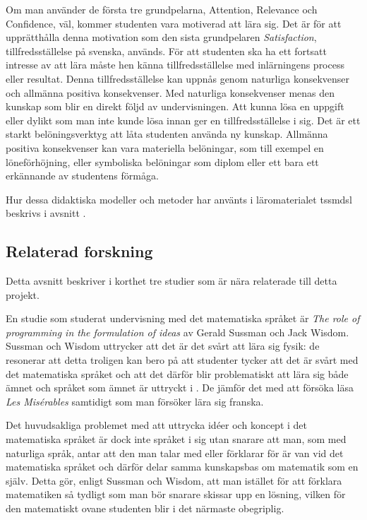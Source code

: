 \documentclass[12pt,a4paper,twoside,openright]{article}
\begin{document}
Om man använder de första tre grundpelarna, Attention, Relevance och
Confidence, väl, kommer studenten vara motiverad att lära sig. Det är
för att upprätthålla denna motivation som den sista grundpelaren
\textit{Satisfaction}, tillfredsställelse på svenska, används. För att
studenten ska ha ett fortsatt intresse av att lära måste hen känna
tillfredsställelse med inlärningens process eller resultat. Denna
tillfredsställelse kan uppnås genom naturliga konsekvenser och
allmänna positiva konsekvenser. Med naturliga konsekvenser menas den
kunskap som blir en direkt följd av undervisningen. Att kunna lösa en
uppgift eller dylikt som man inte kunde lösa innan ger en
tillfredsställelse i sig. Det är ett starkt belöningsverktyg att låta
studenten använda ny kunskap. Allmänna positiva konsekvenser kan vara
materiella belöningar, som till exempel en löneförhöjning, eller
symboliska belöningar som diplom eller ett bara ett erkännande av
studentens förmåga.

Hur dessa didaktiska modeller och metoder har använts i läromaterialet
\gls{tssmdsl} beskrivs i avsnitt .

\subsection{Relaterad forskning}
\label{sec:relForsk}
Detta avsnitt beskriver i korthet tre studier som är nära relaterade
till detta projekt.

En studie som studerat undervisning med det matematiska språket är
\textit{The role of programming in the formulation of ideas} av Gerald
Sussman och Jack Wisdom. Sussman och Wisdom uttrycker att det är det
svårt att lära sig fysik: de resonerar att detta troligen kan bero på
att studenter tycker att det är svårt med det matematiska språket och
att det därför blir problematiskt att lära sig både ämnet och språket
som ämnet är uttryckt i \cite{sussman2002role}. De jämför det med att
försöka läsa \textit{Les Misérables} samtidigt som man försöker lära
sig franska.

Det huvudsakliga problemet med att uttrycka idéer och koncept i det
matematiska språket är dock inte språket i sig utan snarare att man,
som med naturliga språk, antar att den man talar med eller förklarar
för är van vid det matematiska språket och därför delar samma
kunskapsbas om matematik som en själv. Detta gör, enligt Sussman och
Wisdom, att man istället för att förklara matematiken så tydligt som
man bör snarare skissar upp en lösning, vilken för den matematiskt
ovane studenten blir i det närmaste obegriplig.
\end{document}
